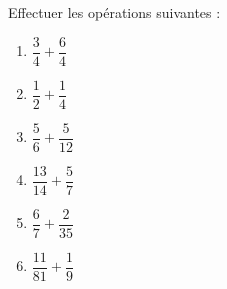 
\begin{exercice}\label{exosmath-0870}

Effectuer les opérations suivantes :
\begin{multicols}{3}
    \begin{enumerate}
        \item
            \( \dfrac{ 3 }{ 4 }+\dfrac{ 6 }{ 4 }\)
        \item
            \( \dfrac{  1  }{ 2 }+\dfrac{  1  }{ 4 }\) 
        \item
            \( \dfrac{  5  }{ 6 }+\dfrac{  5  }{ 12 }\) 
        \item
            \( \dfrac{  13  }{ 14 }+\dfrac{  5  }{ 7 }\) 
        \item
            \( \dfrac{  6  }{ 7 }+\dfrac{  2  }{ 35 }\) 
        \item
            \( \dfrac{  11  }{ 81 }+\dfrac{  1  }{ 9 }\) 
    \end{enumerate}
\end{multicols}

\end{exercice}
